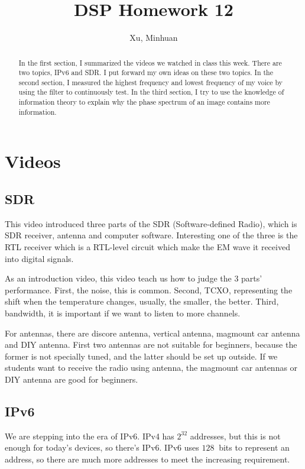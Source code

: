\documentclass{article}
\begin{document}
\title{DSP Homework 12}
\author{Xu, Minhuan}
\maketitle
\tableofcontents
\begin{abstract}
In the first section, I summarized the videos we watched in class this week. There are two topics, IPv6 and SDR. I put forward my own ideas on these two topics. In the second section, I measured the highest frequency and lowest frequency of my voice by using the filter to continuously test. In the third section, I try to use the knowledge of information theory to explain why the phase spectrum of an image contains more information.
\end{abstract}



\section{Videos}
\subsection{SDR}
This video introduced three parts of the SDR (Software-defined Radio), which is SDR receiver, antenna and computer software. Interesting one of the three is the RTL receiver which is a RTL-level circuit which make the EM wave it received into digital signals. 

As an introduction video, this video teach us how to judge the 3 parts' performance. First, the noise, this is common. Second, TCXO, representing the shift when the temperature changes, usually, the smaller, the better. Third, bandwidth, it is important if we want to listen to more channels.

For antennas, there are discore antenna, vertical antenna, magmount car antenna and DIY antenna. First two antennas are not suitable for beginners, because the former is not specially tuned, and the latter should be set up outside. If we students want to receive the radio using antenna, the magmount car antennas or DIY antenna are good for beginners.

\subsection{IPv6}
We are stepping into the era of IPv6. IPv4 has $2^32$ addresses, but this is not enough for today's devices, so there's IPv6. IPv6 uses $128 ~$ bits to represent an address, so there are much more addresses to meet the increasing requirement.
\end{document}
